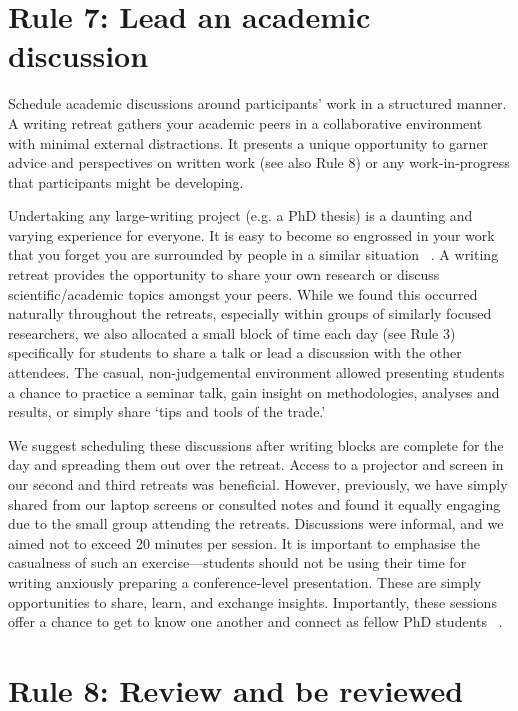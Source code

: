 \documentclass[10pt,letterpaper]{article}
\begin{document}
\section*{Rule 7: Lead an academic discussion}

Schedule academic discussions around participants' work in a structured manner. A writing retreat gathers your academic peers in a collaborative environment with minimal external distractions. It presents a unique opportunity to garner advice and perspectives on written work (see also Rule 8) or any work-in-progress that participants might be developing.

Undertaking any large-writing project (e.g. a PhD thesis) is a daunting and varying experience for everyone. It is easy to become so engrossed in your work that you forget you are surrounded by people in a similar situation ~\cite{wilson2019}. A writing retreat provides the opportunity to share your own research or discuss scientific/academic topics amongst your peers. While we found this occurred naturally throughout the retreats, especially within groups of similarly focused researchers, we also allocated a small block of time each day (see Rule 3) specifically for students to share a talk or lead a discussion with the other attendees. The casual, non-judgemental environment allowed presenting students a chance to practice a seminar talk, gain insight on methodologies, analyses and results, or simply share `tips and tools of the trade.'

We suggest scheduling these discussions after writing blocks are complete for the day and spreading them out over the retreat. Access to a projector and screen in our second and third retreats was beneficial. However, previously, we have simply shared from our laptop screens or consulted notes and found it equally engaging due to the small group attending the retreats. Discussions were informal, and we aimed not to exceed 20 minutes per session. It is important to emphasise the casualness of such an exercise---students should not be using their time for writing anxiously preparing a conference-level presentation. These are simply opportunities to share, learn, and exchange insights. Importantly, these sessions offer a chance to get to know one another and connect as fellow PhD students ~\cite{omeara2017, bernery2022}.

\section*{Rule 8: Review and be reviewed}
\end{document}
